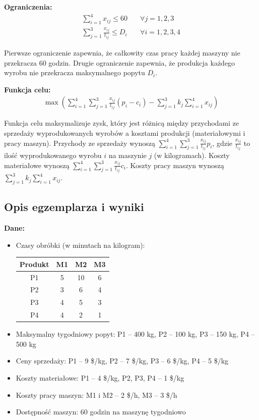 \documentclass[a4paper,12pt]{article}
\begin{document}
\textbf{Ograniczenia:}
\begin{align*}
\sum_{i=1}^{4} x_{ij} \leq 60 \quad &\forall j=1,2,3 \\
\sum_{j=1}^{3} \frac{x_{ij}}{t_{ij}} \leq D_i \quad &\forall i=1,2,3,4
\end{align*}

Pierwsze ograniczenie zapewnia, że całkowity czas pracy każdej maszyny nie przekracza 60 godzin. Drugie ograniczenie zapewnia, że produkcja każdego wyrobu nie przekracza maksymalnego popytu $D_i$.

\textbf{Funkcja celu:}
\begin{align*}
\max \left( \sum_{i=1}^{4} \sum_{j=1}^{3} \frac{x_{ij}}{t_{ij}} (p_i - c_i) - \sum_{j=1}^{3} k_j \sum_{i=1}^{4} x_{ij} \right)
\end{align*}

Funkcja celu maksymalizuje zysk, który jest różnicą między przychodami ze sprzedaży wyprodukowanych wyrobów a kosztami produkcji (materiałowymi i pracy maszyn). Przychody ze sprzedaży wynoszą $\sum_{i=1}^{4} \sum_{j=1}^{3} \frac{x_{ij}}{t_{ij}} p_i$, gdzie $\frac{x_{ij}}{t_{ij}}$ to ilość wyprodukowanego wyrobu $i$ na maszynie $j$ (w kilogramach). Koszty materiałowe wynoszą $\sum_{i=1}^{4} \sum_{j=1}^{3} \frac{x_{ij}}{t_{ij}} c_i$. Koszty pracy maszyn wynoszą $\sum_{j=1}^{3} k_j \sum_{i=1}^{4} x_{ij}$.

\subsection*{Opis egzemplarza i wyniki}

\textbf{Dane:}
\begin{itemize}
\item Czasy obróbki (w minutach na kilogram):
\begin{center}
\begin{tabular}{c|ccc}
Produkt & M1 & M2 & M3 \\
\hline
P1 & 5 & 10 & 6 \\
P2 & 3 & 6 & 4 \\
P3 & 4 & 5 & 3 \\
P4 & 4 & 2 & 1 \\
\end{tabular}
\end{center}
\item Maksymalny tygodniowy popyt: P1 -- 400 kg, P2 -- 100 kg, P3 -- 150 kg, P4 -- 500 kg
\item Ceny sprzedaży: P1 -- 9 \$/kg, P2 -- 7 \$/kg, P3 -- 6 \$/kg, P4 -- 5 \$/kg
\item Koszty materiałowe: P1 -- 4 \$/kg, P2, P3, P4 -- 1 \$/kg
\item Koszty pracy maszyn: M1 i M2 -- 2 \$/h, M3 -- 3 \$/h
\item Dostępność maszyn: 60 godzin na maszynę tygodniowo
\end{itemize}
\end{document}
